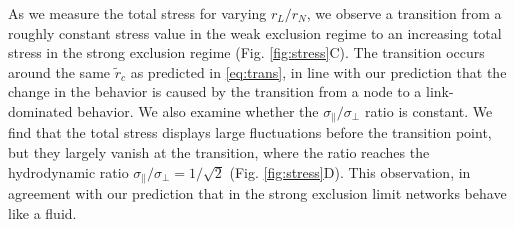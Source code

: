 \documentclass[nofootinbib,preprint,floatfix,titlepage,endfloats]{revtex4} %
\begin{document}


As we measure the total stress for varying $r_L/r_N$, we observe a transition from a roughly constant stress value in the weak exclusion regime to an increasing total stress in the strong exclusion regime (Fig. \ref{fig:stress}C). 
The transition occurs around the same $\tilde{r}_c$ as predicted in \eqref{eq:trans}, in line with our prediction that the change in the behavior is caused by the transition from a node to a link-dominated behavior.  
We also examine whether the $ \sigma_\parallel/ \sigma_\perp$ ratio is constant.
We find that the total stress displays large fluctuations before the transition point, but they largely vanish at the transition, where the ratio  reaches the hydrodynamic ratio $\sigma_\parallel/\sigma_\perp = 1/\sqrt{2}$  (Fig. \ref{fig:stress}D). This observation, in agreement with our prediction that in the strong exclusion limit networks behave like a fluid. 
\end{document}
